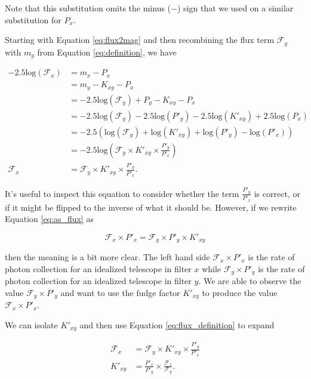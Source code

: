 \documentclass[linenumbers]{aastex631}
\begin{document}
Note that this substitution omits the minus ($-$) sign that we used on a
similar substitution for $P_x$.

Starting with Equation \ref{eq:flux2mag} and then
recombining the flux term $\mathcal{F}_y$ with $m_y$ from Equation
\ref{eq:definition}, we have

\begin{equation}
\begin{aligned}
\label{eq:as_flux}
  -2.5 \text{log}(\mathcal{F}_x)
      &= m_x - P_x \\
      &= m_y - K_{xy} - P_x \\
      &= -2.5 \text{log}(\mathcal{F}_y) + P_y - K_{xy} - P_x \\
      &= -2.5 \text{log}(\mathcal{F}_y)
         - 2.5 \text{log}(P'_y)
         - 2.5 \text{log}(K'_{xy})
         + 2.5 \text{log}(P_x) \\
      &= -2.5 \left(
         \text{log}(\mathcal{F}_y)
         + \text{log}(K'_{xy})
         + \text{log}(P'_y)
         - \text{log}(P'_x)
        \right) \\
      &= -2.5 \text{log}\left(
        \mathcal{F}_y
        \times K'_{xy}
        \times \frac{P'_y}{P'_x}\right) \\
  \mathcal{F}_x &= \mathcal{F}_y \times K'_{xy} \times \frac{P'_y}{P'_x}.
\end{aligned}
\end{equation}

It's useful to inspect this equation to consider whether the term
$\frac{P'_y}{P'_x}$ is correct, or if it might be flipped to the inverse of
what it should be. However, if we rewrite Equation \ref{eq:as_flux} as

\begin{equation}
  \mathcal{F}_x \times P'_x = \mathcal{F}_y \times P'_y \times K'_{xy}
\end{equation}

\noindent then the meaning is a bit more clear. The left hand side
$\mathcal{F}_x \times P'_x$ is the rate of photon collection for an idealized
telescope in filter $x$ while $\mathcal{F}_y \times P'_y$ is the rate of photon
collection for an idealized telescope in filter $y$. We are able to observe the
value $\mathcal{F}_y \times P'_y$ and want to use the fudge factor $K'_{xy}$ to
produce the value $\mathcal{F}_x \times P'_x$.

We can isolate $K'_{xy}$ and then use Equation \ref{eq:flux_definition} to expand

\begin{equation}
\begin{aligned}
  \mathcal{F}_x &= \mathcal{F}_y \times K'_{xy} \times \frac{P'_y}{P'_x} \\
        K'_{xy} &= \frac{P'_x}{P'_y} \times \frac{\mathcal{F}_x}{\mathcal{F}_y} .
\end{aligned}
\end{equation}
\end{document}

